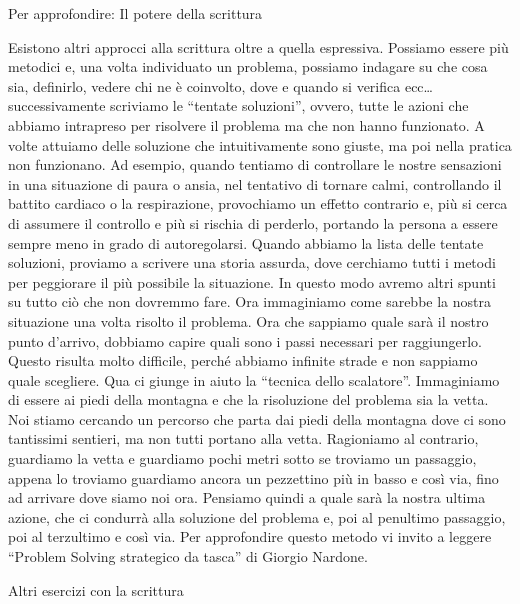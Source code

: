 \documentclass[12pt]{book} %
\begin{document}
Per approfondire: Il potere della scrittura

Esistono altri approcci alla scrittura oltre a quella espressiva. Possiamo essere più metodici e, una volta individuato
un problema, possiamo indagare su che cosa sia, definirlo, vedere chi ne è coinvolto, dove e quando si verifica ecc…
successivamente scriviamo le “tentate soluzioni”, ovvero, tutte le azioni che abbiamo intrapreso per risolvere il
problema ma che non hanno funzionato. A volte attuiamo delle soluzione che intuitivamente sono giuste, ma
poi nella pratica non funzionano. Ad esempio, quando tentiamo di controllare le nostre sensazioni in una situazione di
paura o ansia, nel tentativo di tornare calmi, controllando il battito cardiaco o la respirazione, provochiamo un effetto
contrario e, più si cerca di assumere il controllo e più si rischia di perderlo, portando la persona a essere sempre meno in grado
di autoregolarsi. Quando abbiamo la lista delle tentate soluzioni, proviamo a scrivere una storia assurda, dove
cerchiamo tutti i metodi per peggiorare il più possibile la situazione. In questo modo avremo altri spunti su tutto ciò
che non dovremmo fare. Ora immaginiamo come sarebbe la nostra
situazione una volta risolto il problema. Ora che sappiamo quale sarà il nostro punto d'arrivo, dobbiamo capire quali sono i passi necessari per
raggiungerlo. Questo risulta molto difficile, perché abbiamo infinite strade e non sappiamo quale scegliere. Qua ci
giunge in aiuto la “tecnica dello scalatore”. Immaginiamo di essere ai piedi della montagna e che la risoluzione del
problema sia la vetta. Noi stiamo cercando un percorso che parta dai piedi della montagna dove ci sono tantissimi
sentieri, ma non tutti portano alla vetta. Ragioniamo al contrario, guardiamo la vetta e guardiamo pochi metri sotto se
troviamo un passaggio, appena lo troviamo guardiamo ancora un pezzettino più in basso e così via, fino ad arrivare dove
siamo noi ora. Pensiamo quindi a quale sarà la nostra ultima azione, che ci condurrà alla soluzione del
problema e, poi al penultimo passaggio, poi al terzultimo e così via. 
Per approfondire questo metodo vi invito a leggere “Problem Solving strategico da
tasca” di Giorgio
Nardone.

Altri esercizi con la scrittura
\end{document}
